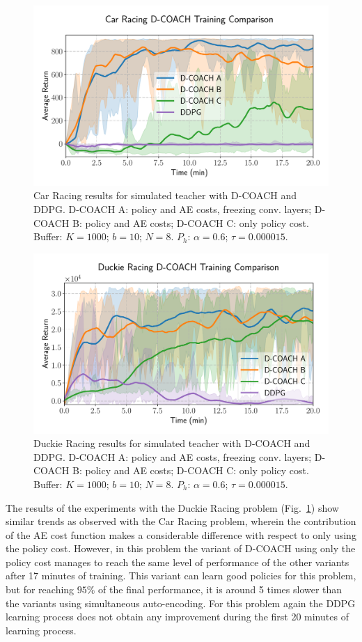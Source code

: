 \begin{figure}[t]
    \centering
    \includegraphics[width=0.9\linewidth]{imagenes/cap3/car_racing_sim_ICRA.pdf}
    \caption{Car Racing results for simulated teacher with D-COACH and DDPG. D-COACH A: policy and AE costs, freezing conv. layers; D-COACH B: policy and AE costs; D-COACH C: only policy cost. Buffer: $K = 1000$; $b = 10$; $N = 8$. $P_{h}$: $\alpha = 0.6$; $\tau = 0.000015$.}
    \label{fig:simulatedteachers}
\end{figure}

\begin{figure}[t]
    \centering
    \includegraphics[width=0.9\linewidth]{imagenes/cap3/duckie_sim_ICRA.pdf}
    \caption{Duckie Racing results for simulated teacher with D-COACH and DDPG. D-COACH A: policy and AE costs, freezing conv. layers; D-COACH B: policy and AE costs; D-COACH C: only policy cost. Buffer: $K = 1000$; $b = 10$; $N = 8$. $P_{h}$: $\alpha = 0.6$; $\tau = 0.000015$.}
    \label{fig:racing_car_results}
\end{figure}

The results of the experiments with the Duckie Racing problem (Fig.~\ref{fig:simulatedteachers}) show similar trends as observed with the Car Racing problem, wherein the contribution of the AE cost function makes a considerable difference with respect to only using the policy cost. However, in this problem the variant of D-COACH using only the policy cost manages to reach the same level of performance of the other variants after 17 minutes of training. This variant can learn good policies for this problem, but for reaching $95\%$ of the final performance, it is around 5 times slower than the variants using simultaneous auto-encoding. For this problem again the DDPG learning process does not obtain any improvement during the first 20 minutes of learning process. 

